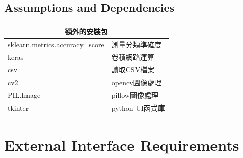\documentclass{scrreprt}
\begin{document}
\begin{CJK}{UTF8}{bkai}
\section{Assumptions and Dependencies}
\begin{tabular}{ |l|l| }
    \hline
    \multicolumn{2}{|c|}{額外的安裝包} \\
    \hline
    sklearn.metrics.accuracy_score & 測量分類準確度 \\
    \hline
    keras & 卷積網路運算 \\
    \hline
    csv & 讀取CSV檔案 \\
    \hline
    cv2 & opencv圖像處理 \\
    \hline
    PIL.Image & pillow圖像處理 \\
    \hline
    tkinter & python UI函式庫 \\
    \hline
\end{tabular}

\chapter{External Interface Requirements}


\end{CJK}
\end{document}
